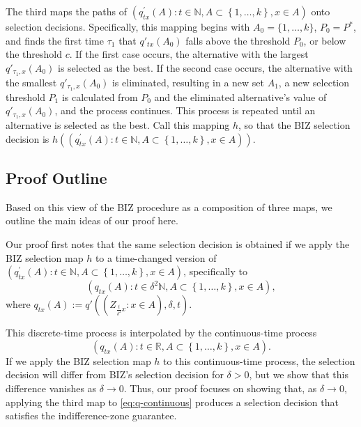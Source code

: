 \documentclass{wscpaperproc}
\theoremstyle{wsc}
\begin{document}
The third maps the paths of $\left(q_{tx}^{'}\left(A\right):t\in\mathbb{N},A\subset\left\{ 1,\ldots,k\right\} ,x\in A\right)$
onto selection decisions. Specifically, this mapping begins with $A_0 = \{1,\ldots,k\}$,
$P_0=P^*$, 
and finds the first time $\tau_1$ that $q'_{tx}(A_0)$ falls above the threshold $P_0$,
or below the threshold $c$.
If the first case occurs, the alternative with the largest $q'_{\tau_1,x}(A_0)$ is selected as the best.
If the second case occurs, the alternative with the smallest
$q'_{\tau_1,x}(A_0)$ is eliminated, resulting in a new set $A_1$, a new selection threshold 
$P_1$ is calculated from $P_0$ and the eliminated alternative's value of $q'_{\tau_1,x}(A_0)$, and the process continues.
This process is repeated until an alternative is selected as the best.
Call this mapping $h$, so that the BIZ selection decision is
$h\left(\left(q_{tx}^{'}\left(A\right):t\in\mathbb{N},A\subset\left\{ 1,\ldots,k\right\} ,x\in A\right)\right)$.

\subsection{Proof Outline}
Based on this view of the BIZ procedure as a composition of three maps, we outline the main ideas of our proof here. 

Our proof first notes that the same selection decision is obtained if we apply
the BIZ selection map $h$ to a time-changed version of 
$\left(q_{tx}^{'}\left(A\right):t\in\mathbb{N},A\subset\left\{ 1,\ldots,k\right\} ,x\in A\right)$, specifically to 
\begin{equation*}
\left(q_{tx}\left(A\right):t\in\delta^2 \mathbb{N},A\subset\left\{ 1,\ldots,k\right\} ,x\in A\right),
\end{equation*}
where
$q_{tx}\left(A\right) := q'\left(\left(Z_{\frac{t}{\delta^{2}}x}:x\in A\right),\delta,t \right)$.

This discrete-time process is interpolated by the continuous-time process 
\begin{equation}
\left(q_{tx}\left(A\right):t\in\mathbb{R},A\subset\left\{ 1,\ldots,k\right\} ,x\in A\right).
\label{eq:q-continuous}
\end{equation}
If we apply the BIZ selection map $h$ to this continuous-time process, the selection decision will differ from BIZ's selection decision for $\delta>0$, but we show that this difference vanishes as $\delta\to0$.  Thus, our proof focuses on showing that, as $\delta\to0$, applying the third map to \eqref{eq:q-continuous} produces a selection decision that satisfies the indifference-zone guarantee. 
\end{document}
